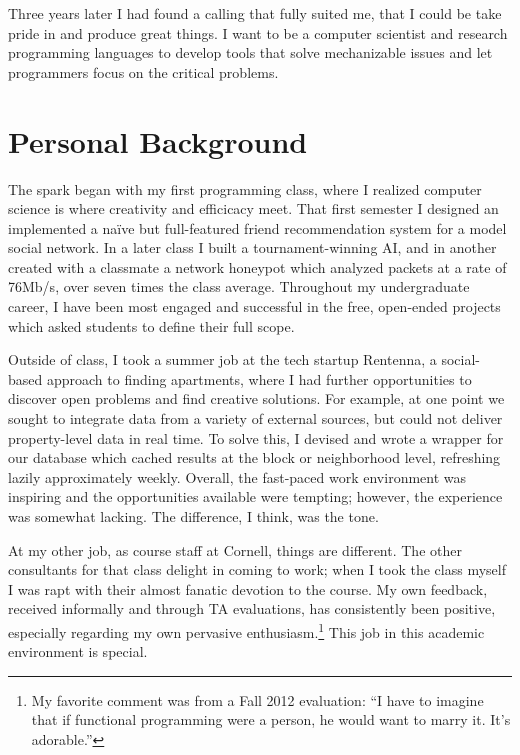 \documentclass{article}
\begin{document}
Three years later I had found a calling that fully suited me, that I could be take pride in and produce great things. 
I want to be a computer scientist and research programming languages to develop tools that solve mechanizable issues and let programmers focus on the critical problems.

\section{Personal Background}

The spark began with my first programming class, where I realized computer science is where creativity and efficicacy meet. 
That first semester I designed an implemented a na\"ive but full-featured friend recommendation system for a model social network.
In a later class I built a tournament-winning AI, and in another created with a classmate a network honeypot which analyzed packets at a rate of 76Mb/s, over seven times the class average.
Throughout my undergraduate career, I have been most engaged and successful in the free, open-ended projects which asked students to define their full scope.

Outside of class, I took a summer job at the tech startup Rentenna, a social-based approach to finding apartments, where I had further opportunities to discover open problems and find creative solutions.
For example, at one point we sought to integrate data from a variety of external sources, but could not deliver property-level data in real time.
To solve this, I devised and wrote a wrapper for our database which cached results at the block or neighborhood level, refreshing lazily approximately weekly.
Overall, the fast-paced work environment was inspiring and the opportunities available were tempting; however, the experience was somewhat lacking.
The difference, I think, was the tone. 

At my other job, as course staff at Cornell, things are different.
The other consultants for that class delight in coming to work; when I took the class myself I was rapt with their almost fanatic devotion to the course. 
My own feedback, received informally and through TA evaluations, has consistently been positive, especially regarding my own pervasive enthusiasm.\footnote{My favorite comment was from a Fall 2012 evaluation: ``I have to imagine that if functional programming were a person, he would want to marry it. It's adorable.''}
This job in this academic environment is special.
\end{document}
